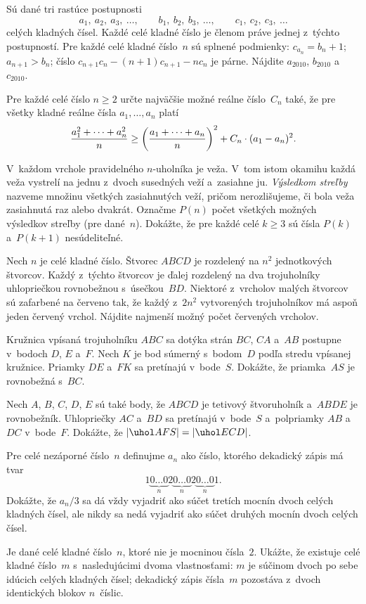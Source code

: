 {%
Sú dané tri rastúce postupnosti
$$
a_1,\ a_2,\ a_3,\ \dots,\qquad b_1,\ b_2,\ b_3,\ \dots,\qquad c_1,\ c_2,\ c_3,\ \dots
$$
celých kladných čísel. Každé celé kladné číslo je členom práve jednej z~týchto postupností. Pre každé celé kladné číslo~$n$ sú splnené podmienky:
$c_{a_n}=b_n+1$;
$a_{n+1}>b_n$;
číslo $c_{n+1}c_n-(n+1)c_{n+1}-nc_n$ je párne.
\endgraf\noindent
Nájdite $a_{2010}$, $b_{2010}$ a $c_{2010}$.}

{%
Pre každé celé číslo $n\ge2$ určte najväčšie možné reálne číslo~$C_n$ také, že
pre všetky kladné reálne čísla $a_1, \dots, a_n$ platí
$$
\postdisplaypenalty=10000
\frac{a_1^2+\cdots+a_n^2}n \ge \left(\frac{a_1+\cdots+a_n}n\right)^2 + C_n\cdot(a_1-a_n)^2.
$$}

{%
V~každom vrchole pravidelného $n$-uholníka je veža. V~tom istom okamihu každá veža
vystrelí na jednu z~dvoch susedných veží a~zasiahne ju. {\it Výsledkom streľby\/} nazveme množinu všetkých zasiahnutých veží, pričom nerozlišujeme, či bola veža zasiahnutá raz alebo dvakrát.
Označme $P(n)$ počet všetkých možných výsledkov streľby (pre dané~$n$).
Dokážte, že pre každé celé $k\ge3$ sú čísla $P(k)$ a~$P(k+1)$ nesúdeliteľné.}

{%
Nech $n$ je celé kladné číslo. Štvorec $ABCD$ je rozdelený na $n^2$ jednotkových štvorcov. Každý z~týchto štvorcov je ďalej rozdelený na dva trojuholníky uhlopriečkou rovnobežnou s~úsečkou~$BD$. Niektoré z~vrcholov malých štvorcov sú zafarbené na červeno tak, že každý z~$2n^2$ vytvorených trojuholníkov má aspoň jeden červený vrchol. Nájdite najmenší možný počet červených vrcholov.}

{%
Kružnica vpísaná trojuholníku $ABC$ sa dotýka strán $BC$, $CA$ a~$AB$ postupne v~bodoch $D$, $E$ a~$F$.
Nech $K$ je bod súmerný s~bodom~$D$ podľa stredu vpísanej kružnice. Priamky $DE$ a~$FK$ sa pretínajú v~bode~$S$. Dokážte, že priamka~$AS$ je rovnobežná s~$BC$.}

{%
Nech $A$, $B$, $C$, $D$, $E$ sú také body, že $ABCD$ je tetivový štvoruholník a~$ABDE$ je rovnobežník. Uhlopriečky $AC$ a~$BD$ sa pretínajú v~bode~$S$ a~polpriamky $AB$ a~$DC$ v~bode~$F$. Dokážte, že $|\uhol AFS|=|\uhol ECD|$.}

{%
Pre celé nezáporné číslo~$n$ definujme $a_n$ ako číslo, ktorého dekadický zápis má tvar
$$
1\underbrace{0\dots0}_{n}2\underbrace{0\dots0}_{n}2\underbrace{0\dots0}_{n}1.
$$
Dokážte, že $a_n/3$ sa dá vždy vyjadriť ako súčet tretích mocnín dvoch celých kladných čísel, ale nikdy sa nedá vyjadriť ako súčet druhých mocnín dvoch celých čísel.}

{%
Je dané celé kladné číslo~$n$, ktoré nie je mocninou čísla~$2$. Ukážte, že existuje celé kladné číslo~$m$ s~nasledujúcimi dvoma vlastnosťami:
$m$ je súčinom dvoch po sebe idúcich celých kladných čísel;
dekadický zápis čísla~$m$ pozostáva z~dvoch identických blokov $n$~číslic.
\endgraf
}
